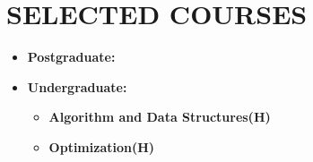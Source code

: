 \documentclass[11pt,a4paper,roman]{moderncv}        %
\begin{document}
	
	\section{SELECTED COURSES}
	
	\begin{itemize}
		\item \textbf{Postgraduate:} \vspace*{0.75mm} \\
		\vspace*{1.75mm}
		\item \textbf{Undergraduate:} \vspace*{0.75mm} 
			\begin{itemize}
				\item \textbf{Algorithm and Data Structures(H)} 
				\item \textbf{Optimization(H)} 
			\end{itemize}
 	\end{itemize}

	\cfoot{\vspace{-2mm}{\color{gray} \rule[-10pt]{14.3cm}{0.05em}} \vspace{2mm}\\ \emph{\textcolor{gray}{Last Updated by: Dec. 19th, 2023}}}
	
\end{document}
